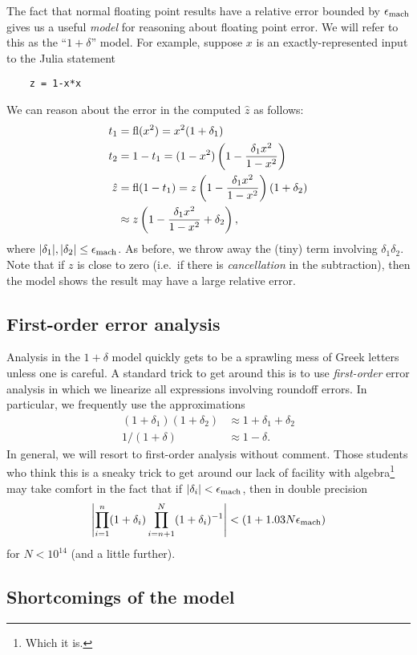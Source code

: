 \documentclass[12pt, leqno]{article} %
\begin{document}
The fact that normal floating point results have a relative error
bounded by $\epsilon_{\mathrm{mach}}$ gives us a useful {\em model} for reasoning about
floating point error.  We will refer to this as the ``$1 + \delta$''
model.  For example, suppose $x$ is an exactly-represented input to
the Julia statement
\begin{lstlisting}
    z = 1-x*x
\end{lstlisting}
We can reason about the error in the computed $\hat{z}$ as follows:
\begin{align*}
  t_1 &= \operatorname{fl}(x^2) = x^2 (1+\delta_1) \\
  t_2 &= 1-t_1 = (1-x^2)\left( 1 - \frac{\delta_1 x^2}{1-x^2} \right) \\
  \hat{z}
  &= \operatorname{fl}(1-t_1)
    = z \left( 1 - \frac{\delta_1 x^2}{1-x^2} \right)(1+\delta_2) \\
  & \approx z \left( 1 - \frac{\delta_1 x^2}{1-x^2} +\delta_2 \right),
\end{align*}
where $|\delta_1|, |\delta_2| \leq \epsilon_{\mathrm{mach}}$.  As before, we throw
away the (tiny) term involving $\delta_1 \delta_2$.
Note that if $z$ is close to zero (i.e.~if there is {\em cancellation} in the
subtraction), then the model shows the result may have a
large relative error.

\subsection{First-order error analysis}

Analysis in the $1+\delta$ model quickly gets to be a sprawling mess
of Greek letters unless one is careful.  A standard trick to get
around this is to use {\em first-order} error analysis in which we
linearize all expressions involving roundoff errors.  In particular,
we frequently use the approximations
\begin{align*}
  (1+\delta_1)(1+\delta_2) & \approx 1+\delta_1 + \delta_2 \\
  1/(1+\delta) & \approx 1-\delta.
\end{align*}
In general, we will resort to first-order analysis without comment.
Those students who think this is a sneaky trick to get around our
lack of facility with algebra\footnote{%
Which it is.
}
may take comfort in the fact that if $|\delta_i| < \epsilon_{\mathrm{mach}}$, then
in double precision
\[
  \left| \prod_{i=1}^n (1+\delta_i) \prod_{i=n+1}^N (1+\delta_i)^{-1} \right| < (1+1.03 N \epsilon_{\mathrm{mach}})
\]
for $N < 10^{14}$ (and a little further).

\subsection{Shortcomings of the model}
\end{document}
